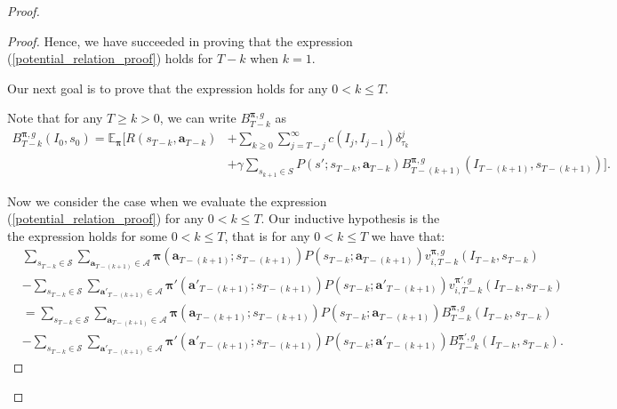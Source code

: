 \documentclass{article}
\begin{document}
\begin{proof}
\begin{proof}

Hence, we have succeeded in proving that the expression (\ref{potential_relation_proof}) holds for $T-k$ when $k=1$.

Our next goal is to prove that the expression holds for any $0<k\leq T$.

\noindent Note that for any $T \geq k> 0$, we can write $B^{\boldsymbol{\pi},g}_{T-k}$ as 
\begin{align}
B^{\boldsymbol{\pi},g}_{T-k}(I_0,s_0)=\mathbb{E}_{\boldsymbol{\pi}}\Bigg[R(s_{T-k},\boldsymbol{a}_{T-k})&+\sum_{k\geq 0}\sum_{j= T-j}^\infty c(I_j,I_{j-1})\delta^j_{\tau_k}
\\&+\gamma\sum_{s_{k+1}\in S} P(s';s_{T-k},\boldsymbol{a}_{T-k})B^{\boldsymbol{\pi},g}_{T-(k+1)}(I_{T-(k+1)},s_{T-(k+1)})\Bigg].
\end{align}

Now we consider the case when we evaluate the expression (\ref{potential_relation_proof}) for any $0<k\leq T$. Our inductive hypothesis is the the expression holds for some $0<k\leq T$, that is for any $0<k\leq T$ we have that:
\begin{align}\nonumber 
 &\sum_{s_{T-k}\in\mathcal{S}}\sum_{\boldsymbol{a}_{T-(k+1)}\in\boldsymbol{\mathcal{A}}}\boldsymbol{\pi}(\boldsymbol{a}_{T-(k+1)};s_{T-(k+1)})P(s_{T-k};\boldsymbol{a}_{T-(k+1)})v^{\boldsymbol{\pi},g}_{i,T-k}(I_{T-k},s_{T-k})
\\&-
\sum_{s_{T-k}\in\mathcal{S}}\sum_{\boldsymbol{a'}_{T-(k+1)}\in\boldsymbol{\mathcal{A}}}\boldsymbol{\pi'}(\boldsymbol{a'}_{T-(k+1)};s_{T-(k+1)})P(s_{T-k};\boldsymbol{a'}_{T-(k+1)})v^{\boldsymbol{\pi'},g}_{i,T-k}(I_{T-k},s_{T-k})
\\&=\sum_{s_{T-k}\in\mathcal{S}}\sum_{\boldsymbol{a}_{T-(k+1)}\in\boldsymbol{\mathcal{A}}}\boldsymbol{\pi}(\boldsymbol{a}_{T-(k+1)};s_{T-(k+1)})P(s_{T-k};\boldsymbol{a}_{T-(k+1)})B^{\boldsymbol{\pi},g}_{T-k}(I_{T-k},s_{T-k})
\\&-
\sum_{s_{T-k}\in\mathcal{S}}\sum_{\boldsymbol{a'}_{T-(k+1)}\in\boldsymbol{\mathcal{A}}}\boldsymbol{\pi'}(\boldsymbol{a'}_{T-(k+1)};s_{T-(k+1)})P(s_{T-k};\boldsymbol{a'}_{T-(k+1)})B^{\boldsymbol{\pi'},g}_{T-k}(I_{T-k},s_{T-k}).\label{inductive_hyp}
\end{align}


\end{proof}
\end{proof}
\end{document}
